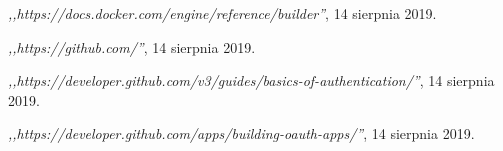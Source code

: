 \begin{thebibliography}{99}
  \emph{,,https://docs.docker.com/engine/reference/builder''}, 14 sierpnia 2019.

 \emph{,,https://github.com/''}, 14 sierpnia 2019.

 \emph{,,https://developer.github.com/v3/guides/basics-of-authentication/''}, 14 sierpnia 2019.

 \emph{,,https://developer.github.com/apps/building-oauth-apps/''}, 14 sierpnia 2019.

\end{thebibliography}
\clearpage




